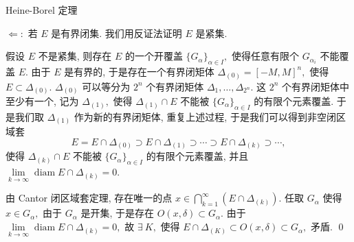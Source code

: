 \begin{frame}{Heine-Borel 定理}

$\Longleftarrow:$ 若 $E$ 是有界闭集. 我们用反证法证明 $E$ 是紧集.

\pause
\vspace{0.5em}

假设 $E$ 不是紧集, 则存在 $E$ 的一个开覆盖 $\{ G_{\alpha} \}_{\alpha \in I},$ 使得任意有限个 $G_{\alpha_i}$ 不能覆盖 $E.$
由于 $E$ 是有界的, 于是存在一个有界闭矩体 $\Delta_{(0)} = [-M, M]^n,$ 使得 $E \subset \Delta_{(0)}.$
$\Delta_{(0)}$ 可以等分为 $2^n$ 个有界闭矩体 $\Delta_1, \dots, \Delta_{2^n}.$
这 $2^n$ 个有界闭矩体中至少有一个, 记为 $\Delta_{(1)},$ 使得 $\Delta_{(1)} \cap E$ 不能被 $\{ G_{\alpha} \}_{\alpha \in I}$ 的有限个元素覆盖.
于是我们取 $\Delta_{(1)}$ 作为新的有界闭矩体, 重复上述过程, 于是我们可以得到非空闭区域套
\[E = E \cap \Delta_{(0)} \supset E \cap \Delta_{(1)} \supset \cdots \supset E \cap \Delta_{(k)} \supset \cdots,\]
使得 $\Delta_{(k)}\cap E$ 不能被 $\{ G_{\alpha} \}_{\alpha \in I}$ 的有限个元素覆盖, 并且 $\lim\limits_{k\to\infty} \operatorname{diam} E \cap \Delta_{(k)} = 0.$

\pause

由 Cantor 闭区域套定理, 存在唯一的点 $x \in \bigcap\limits_{k=1}^{\infty} (E \cap \Delta_{(k)}).$ 任取 $G_{\alpha}$ 使得 $x \in G_{\alpha},$ 由于 $G_{\alpha}$ 是开集, 于是存在 $O(x, \delta) \subset G_{\alpha}.$ 由于 $\lim\limits_{k\to\infty} \operatorname{diam} E \cap \Delta_{(k)} = 0,$ 故 $\exists ~ K,$ 使得 $E \cap \Delta_{(K)} \subset O(x, \delta) \subset G_{\alpha},$ 矛盾.
\qed

\end{frame}


